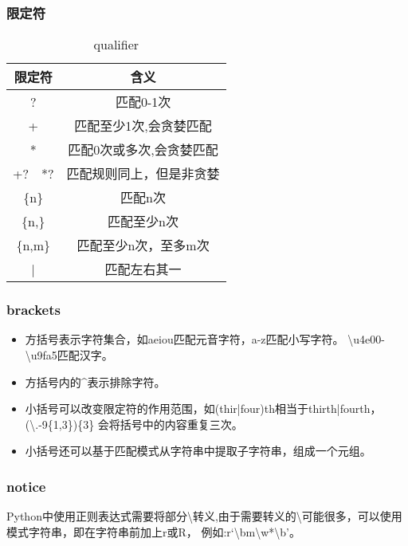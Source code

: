 \documentclass{article}
\begin{document}
      \subsubsection{限定符}
        \begin{table}[H]
          \centering
          \caption{qualifier}
          \label{tab:qualifier}
          \begin{tabular}{cc}
            \toprule[1.5pt]
            限定符 & 含义 \\
            \midrule
            ? & 匹配0-1次 \\
            + & 匹配至少1次,会贪婪匹配 \\
            * & 匹配0次或多次,会贪婪匹配 \\
            +?~~*? & 匹配规则同上，但是非贪婪 \\
            \{n\} & 匹配n次 \\
            \{n,\} & 匹配至少n次 \\
            \{n,m\} & 匹配至少n次，至多m次 \\
            | & 匹配左右其一 \\
            \bottomrule[1.5pt]
          \end{tabular}
        \end{table}

      \subsubsection{brackets}
        \begin{itemize}
          \item 方括号表示字符集合，如\lbrack aeiou\rbrack 匹配元音字符，\lbrack a-z\rbrack 匹配小写字符。
            \lbrack\textbackslash u4e00-\textbackslash u9fa5\rbrack 匹配汉字。
          \item 方括号内的\^{}表示排除字符。
          \item 小括号可以改变限定符的作用范围，如(thir|four)th相当于thirth|fourth，(\textbackslash .-9\rbrack\{1,3\})\{3\}
            会将括号中的内容重复三次。
          \item 小括号还可以基于匹配模式从字符串中提取子字符串，组成一个元组。
        \end{itemize}

      \subsubsection{notice}
        Python中使用正则表达式需要将部分\textbackslash 转义,由于需要转义的\textbackslash 可能很多，可以使用模式字符串，即在字符串前加上r或R，
        例如:r`\textbackslash bm\textbackslash w*\textbackslash b'。
\end{document}
